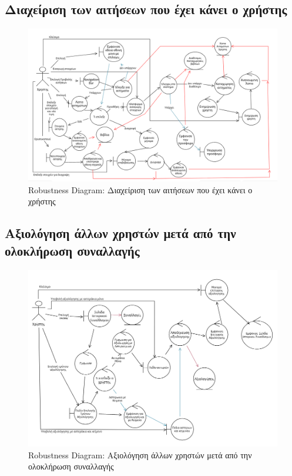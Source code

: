 \documentclass[12pt,a4paper]{article}
\begin{document}
\subsection{Διαχείριση των αιτήσεων που έχει κάνει ο χρήστης}
\begin{figure}[H]
	\includegraphics[width=\textwidth]{Manage User Requests Robustness.png}
	\caption{Robustness Diagram: Διαχείριση των αιτήσεων που έχει κάνει ο χρήστης}
	\label{Robustness Diagram: Διαχείριση των αιτήσεων που έχει κάνει ο χρήστης}
\end{figure}

\subsection{Αξιολόγηση άλλων χρηστών μετά από την ολοκλήρωση συναλλαγής}
\begin{figure}[H]
	\includegraphics[width=\textwidth]{Review after Transaction Robustness.png}
	\caption{Robustness Diagram: Αξιολόγηση άλλων χρηστών μετά από την ολοκλήρωση συναλλαγής}
	\label{Robustness Diagram: Αξιολόγηση άλλων χρηστών μετά από την ολοκλήρωση συναλλαγής}
\end{figure}
\end{document}
